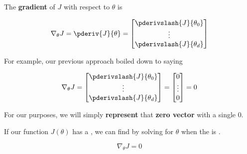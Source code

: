         \begin{kequation}
            The \textbf{gradient} of $J$ with respect to $\theta$ is
            
            \begin{equation}
                \nabla_\theta J =
                \pderiv{J}{\theta} =
                \begin{bmatrix}
                    \pderivslash{J}{\theta_0} \\
                    \vdots \\
                    \pderivslash{J}{\theta_d}
                \end{bmatrix}
            \end{equation}
        
        \end{kequation}
        
        
        For example, our previous approach boiled down to saying
        
        \begin{equation}
            \nabla_\theta J =
            \begin{bmatrix}
                \pderivslash{J}{\theta_0} \\
                \vdots \\
                \pderivslash{J}{\theta_d}
            \end{bmatrix}
            = 
            \begin{bmatrix}
                0 \\
                \vdots \\
                0
            \end{bmatrix}
            =
            0
        \end{equation}
        
        For our purposes, we will simply \textbf{represent} that \textbf{zero vector} with a single 0.\\
        
        \begin{concept}
            
            If our function $J(\theta)$ has a , we can  find  by solving for $\theta$ when the  is .
            
            \begin{equation*}
                \nabla_\theta J=0
            \end{equation*}

        \end{concept}
        
